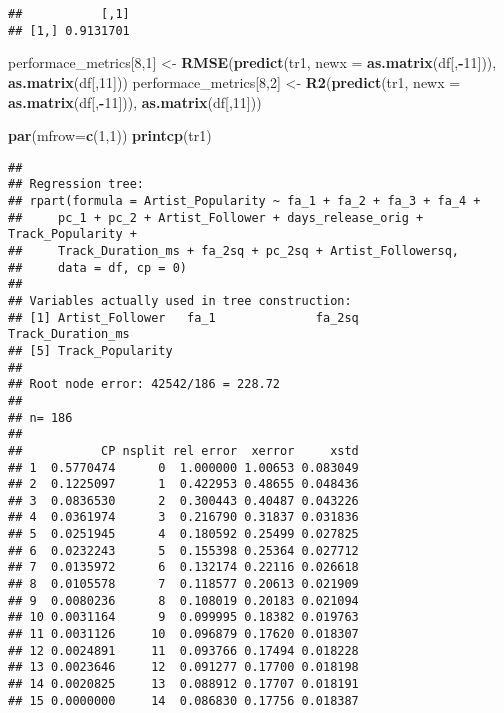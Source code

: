 \documentclass[
]{article}
\newenvironment{Shaded}{\begin{snugshade}}{\end{snugshade}}
\newcommand{\DataTypeTok}[1]{\textcolor[rgb]{0.13,0.29,0.53}{#1}}
\newcommand{\DecValTok}[1]{\textcolor[rgb]{0.00,0.00,0.81}{#1}}
\newcommand{\KeywordTok}[1]{\textcolor[rgb]{0.13,0.29,0.53}{\textbf{#1}}}
\newcommand{\NormalTok}[1]{#1}
\newcommand{\OperatorTok}[1]{\textcolor[rgb]{0.81,0.36,0.00}{\textbf{#1}}}
\newcommand{\StringTok}[1]{\textcolor[rgb]{0.31,0.60,0.02}{#1}}
\begin{document}
\begin{verbatim}
##           [,1]
## [1,] 0.9131701
\end{verbatim}

\begin{Shaded}
\begin{Highlighting}[]
\NormalTok{performace_metrics[}\DecValTok{8}\NormalTok{,}\DecValTok{1}\NormalTok{] <-}\StringTok{ }\KeywordTok{RMSE}\NormalTok{(}\KeywordTok{predict}\NormalTok{(tr1, }\DataTypeTok{newx =} \KeywordTok{as.matrix}\NormalTok{(df[,}\OperatorTok{-}\DecValTok{11}\NormalTok{])), }\KeywordTok{as.matrix}\NormalTok{(df[,}\DecValTok{11}\NormalTok{]))}
\NormalTok{performace_metrics[}\DecValTok{8}\NormalTok{,}\DecValTok{2}\NormalTok{] <-}\StringTok{ }\KeywordTok{R2}\NormalTok{(}\KeywordTok{predict}\NormalTok{(tr1, }\DataTypeTok{newx =} \KeywordTok{as.matrix}\NormalTok{(df[,}\OperatorTok{-}\DecValTok{11}\NormalTok{])), }\KeywordTok{as.matrix}\NormalTok{(df[,}\DecValTok{11}\NormalTok{]))}

\KeywordTok{par}\NormalTok{(}\DataTypeTok{mfrow=}\KeywordTok{c}\NormalTok{(}\DecValTok{1}\NormalTok{,}\DecValTok{1}\NormalTok{))}
\KeywordTok{printcp}\NormalTok{(tr1)}
\end{Highlighting}
\end{Shaded}

\begin{verbatim}
## 
## Regression tree:
## rpart(formula = Artist_Popularity ~ fa_1 + fa_2 + fa_3 + fa_4 + 
##     pc_1 + pc_2 + Artist_Follower + days_release_orig + Track_Popularity + 
##     Track_Duration_ms + fa_2sq + pc_2sq + Artist_Followersq, 
##     data = df, cp = 0)
## 
## Variables actually used in tree construction:
## [1] Artist_Follower   fa_1              fa_2sq            Track_Duration_ms
## [5] Track_Popularity 
## 
## Root node error: 42542/186 = 228.72
## 
## n= 186 
## 
##           CP nsplit rel error  xerror     xstd
## 1  0.5770474      0  1.000000 1.00653 0.083049
## 2  0.1225097      1  0.422953 0.48655 0.048436
## 3  0.0836530      2  0.300443 0.40487 0.043226
## 4  0.0361974      3  0.216790 0.31837 0.031836
## 5  0.0251945      4  0.180592 0.25499 0.027825
## 6  0.0232243      5  0.155398 0.25364 0.027712
## 7  0.0135972      6  0.132174 0.22116 0.026618
## 8  0.0105578      7  0.118577 0.20613 0.021909
## 9  0.0080236      8  0.108019 0.20183 0.021094
## 10 0.0031164      9  0.099995 0.18382 0.019763
## 11 0.0031126     10  0.096879 0.17620 0.018307
## 12 0.0024891     11  0.093766 0.17494 0.018228
## 13 0.0023646     12  0.091277 0.17700 0.018198
## 14 0.0020825     13  0.088912 0.17707 0.018191
## 15 0.0000000     14  0.086830 0.17756 0.018387
\end{verbatim}
\end{document}
